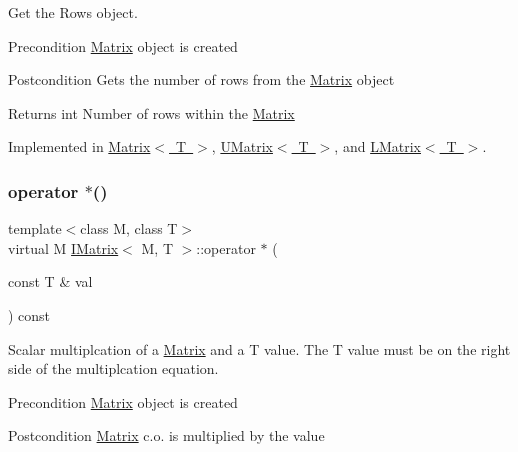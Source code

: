 Get the Rows object. 

\begin{DoxyPrecond}{Precondition}
\mbox{\hyperlink{class_matrix}{Matrix}} object is created 
\end{DoxyPrecond}
\begin{DoxyPostcond}{Postcondition}
Gets the number of rows from the \mbox{\hyperlink{class_matrix}{Matrix}} object 
\end{DoxyPostcond}
\begin{DoxyReturn}{Returns}
int Number of rows within the \mbox{\hyperlink{class_matrix}{Matrix}} 
\end{DoxyReturn}


Implemented in \mbox{\hyperlink{class_matrix_aa665db4bc173a7bb4ec3f9da2676dfa6}{Matrix$<$ T $>$}}, \mbox{\hyperlink{class_u_matrix_ae261286236cb23a0dfa1296591f4c3ad}{U\+Matrix$<$ T $>$}}, and \mbox{\hyperlink{class_l_matrix_ad4ed9d329dbd01d010504a97b3879442}{L\+Matrix$<$ T $>$}}.

\mbox{\label{class_i_matrix_a10121e038635bdf33552c6a1fb288398}} 
\subsubsection{\texorpdfstring{operator $\ast$()}{operator *()}}
{\footnotesize\ttfamily template$<$class M, class T$>$ \\
virtual M \mbox{\hyperlink{class_i_matrix}{I\+Matrix}}$<$ M, T $>$\+::operator $\ast$ (\begin{DoxyParamCaption}\item[{const T \&}]{val }\end{DoxyParamCaption}) const\hspace{0.3cm}{\ttfamily [pure virtual]}}



Scalar multiplcation of a \mbox{\hyperlink{class_matrix}{Matrix}} and a T value. The T value must be on the right side of the multiplcation equation. 

\begin{DoxyPrecond}{Precondition}
\mbox{\hyperlink{class_matrix}{Matrix}} object is created 
\end{DoxyPrecond}
\begin{DoxyPostcond}{Postcondition}
\mbox{\hyperlink{class_matrix}{Matrix}} c.\+o. is multiplied by the value 
\end{DoxyPostcond}

